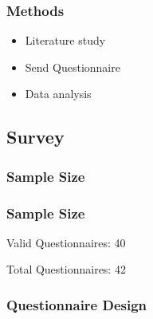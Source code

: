 \begin{frame}
    \frametitle{Methods}
    \LARGE
    \begin{itemize}[<+->]
        \item Literature study
        \item Send Questionnaire
        \item Data analysis
    \end{itemize}
\end{frame}

\subsection{Survey}
\subsubsection*{Sample Size}

\begin{frame}
    \frametitle{Sample Size}
    \LARGE
    \begin{center}
        Valid Questionnaires: 40

        Total Questionnaires: 42
    \end{center}
\end{frame}

\subsubsection*{Questionnaire Design}
